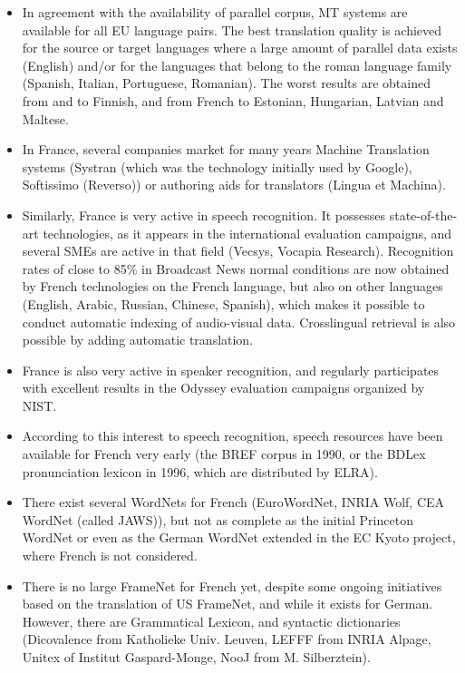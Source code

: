 \documentclass[]{../metanetpaper}
\begin{document}
\begin{multicols}{2}
\begin{itemize}
\item In agreement with the availability of parallel corpus, MT systems are
available for all EU language pairs. The best translation quality is
achieved for the source or target languages where a large amount of
parallel data exists (English) and/or for the languages that belong to
the roman language family (Spanish, Italian, Portuguese,
Romanian). The worst results are obtained from and to Finnish, and
from French to Estonian, Hungarian, Latvian and Maltese.

\item In France, several companies market for many years Machine Translation
systems (Systran (which was the technology initially used by Google),
Softissimo (Reverso)) or authoring aids for translators (Lingua et
Machina).

\item Similarly, France is very active in speech recognition. It possesses
state-of-the-art technologies, as it appears in the international
evaluation campaigns, and several SMEs are active in that field
(Vecsys, Vocapia Research). Recognition rates of close to 85\% in
Broadcast News normal conditions are now obtained by French
technologies on the French language, but also on other languages
(English, Arabic, Russian, Chinese, Spanish), which makes it possible
to conduct automatic indexing of audio-visual data. Crosslingual
retrieval is also possible by adding automatic translation.

\item France is also very active in speaker recognition, and regularly
participates with excellent results in the Odyssey evaluation
campaigns organized by NIST.

\item According to this interest to speech recognition, speech resources
have been available for French very early (the BREF corpus in 1990, or
the BDLex pronunciation lexicon in 1996, which are distributed by
ELRA).

\item There exist several WordNets for French (EuroWordNet, INRIA Wolf, CEA
WordNet (called JAWS)), but not as complete as the initial Princeton
WordNet or even as the German WordNet extended in the EC Kyoto
project, where French is not considered.

\item There is no large FrameNet for French yet, despite some ongoing
initiatives based on the translation of US FrameNet, and while it
exists for German. However, there are Grammatical Lexicon, and
syntactic dictionaries (Dicovalence from Katholieke Univ. Leuven,
LEFFF from INRIA Alpage, Unitex of Institut Gaspard-Monge, NooJ from M. Silberztein).


\end{itemize}
\end{multicols}
\end{document}
